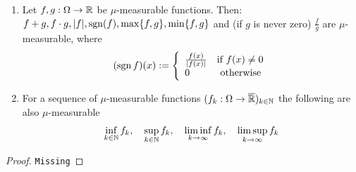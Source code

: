\begin{thm}[] \label{thm:measurable-operation}
\phantom{a}
\begin{enumerate}
  \item Let $f,g: \Omega \to  \mathbb{R}$ be $\mu$-measurable functions. Then:
    $f + g, f \cdot g, \vert f\vert, \operatorname{sgn}(f), \max\{f,g\}, \min \{f,g\}$ and (if $g$ is never zero) $\frac{f}{g}$ are $\mu$-measurable, where
    \begin{align*}
      (\operatorname{sgn} f)(x) := \left\{\begin{array}{ll}
          \frac{f(x)}{\vert f(x)\vert} & \text{if } f(x) \neq 0\\
        0 & \text{ otherwise}
      \end{array} \right.
    \end{align*}
  \item For a sequence of $\mu$-measurable functions $(f_k: \Omega \to  \overline{\mathbb{R}})_{k \in \mathbb{N}}$ the following are also $\mu$-measurable
    \begin{align*}
      \inf_{k \in \mathbb{N}} f_k, \quad
      \sup_{k \in \mathbb{N}} f_k, \quad
      \liminf_{k \to  \infty} f_k, \quad
      \limsup_{k \to \infty} f_k 
    \end{align*}
\end{enumerate}
\end{thm}
\begin{proof}
\texttt{Missing}
\end{proof}



